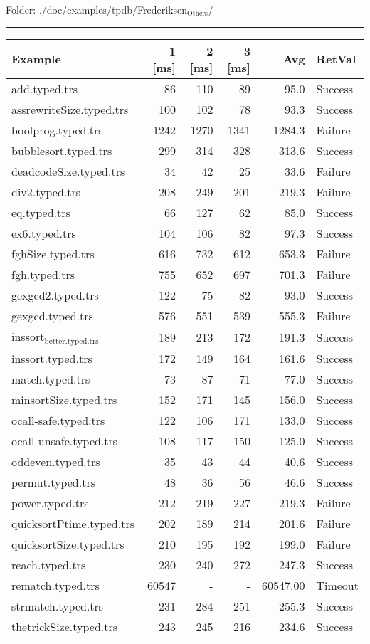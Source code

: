 \documentclass[11pt]{article}
\begin{document}
Folder: ./doc/examples/tpdb/Frederiksen\(_{\text{Others}}\)/

\rule{\linewidth}{0.5pt}

\begin{center}
\begin{tabular}{lrrrrl}
Example & 1 [ms] & 2 [ms] & 3 [ms] & Avg & RetVal\\
\hline
add.typed.trs & 86 & 110 & 89 & 95.0 & Success\\
assrewriteSize.typed.trs & 100 & 102 & 78 & 93.3 & Success\\
boolprog.typed.trs & 1242 & 1270 & 1341 & 1284.3 & Failure\\
bubblesort.typed.trs & 299 & 314 & 328 & 313.6 & Success\\
deadcodeSize.typed.trs & 34 & 42 & 25 & 33.6 & Failure\\
div2.typed.trs & 208 & 249 & 201 & 219.3 & Failure\\
eq.typed.trs & 66 & 127 & 62 & 85.0 & Success\\
ex6.typed.trs & 104 & 106 & 82 & 97.3 & Success\\
fghSize.typed.trs & 616 & 732 & 612 & 653.3 & Failure\\
fgh.typed.trs & 755 & 652 & 697 & 701.3 & Failure\\
gexgcd2.typed.trs & 122 & 75 & 82 & 93.0 & Success\\
gexgcd.typed.trs & 576 & 551 & 539 & 555.3 & Failure\\
inssort\(_{\text{better.typed.trs}}\) & 189 & 213 & 172 & 191.3 & Success\\
inssort.typed.trs & 172 & 149 & 164 & 161.6 & Success\\
match.typed.trs & 73 & 87 & 71 & 77.0 & Success\\
minsortSize.typed.trs & 152 & 171 & 145 & 156.0 & Success\\
ocall-safe.typed.trs & 122 & 106 & 171 & 133.0 & Success\\
ocall-unsafe.typed.trs & 108 & 117 & 150 & 125.0 & Success\\
oddeven.typed.trs & 35 & 43 & 44 & 40.6 & Success\\
permut.typed.trs & 48 & 36 & 56 & 46.6 & Success\\
power.typed.trs & 212 & 219 & 227 & 219.3 & Failure\\
quicksortPtime.typed.trs & 202 & 189 & 214 & 201.6 & Failure\\
quicksortSize.typed.trs & 210 & 195 & 192 & 199.0 & Failure\\
reach.typed.trs & 230 & 240 & 272 & 247.3 & Success\\
rematch.typed.trs & 60547 & - & - & 60547.00 & Timeout\\
strmatch.typed.trs & 231 & 284 & 251 & 255.3 & Success\\
thetrickSize.typed.trs & 243 & 245 & 216 & 234.6 & Success\\
\end{tabular}

\end{center}
\end{document}
